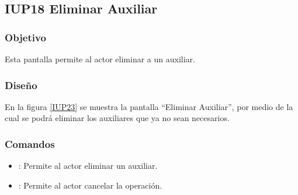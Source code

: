 \subsection{IUP18 Eliminar Auxiliar}
 
\subsubsection{Objetivo}

    Esta pantalla permite al actor eliminar a un auxiliar.

\subsubsection{Diseño}

    En la figura \ref{IUP23} se muestra la pantalla ``Eliminar Auxiliar'', por medio de la cual se podrá eliminar los auxiliares que ya no sean necesarios. \\


\subsubsection{Comandos}
\begin{itemize}
    \item {}: Permite al actor eliminar un auxiliar.
    \item {}: Permite al actor cancelar la operación.
    
\end{itemize}

%
